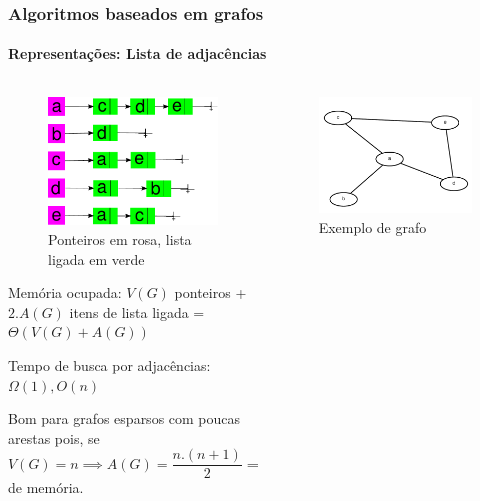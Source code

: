 \begin{frame}
	\frametitle{Algoritmos baseados em grafos}
	\framesubtitle{Representações: Lista de adjacências}
	\begin{columns}
	\begin{column}{0.6\textwidth}
		\begin{figure}
			\centering
			\includegraphics[width=0.4\linewidth]{images/listasDeAdjacencias}
			\caption{Ponteiros em rosa, lista ligada em verde}
			\label{fig:listasdeadjacencias}
		\end{figure}
		\par Memória ocupada: $V(G)$ ponteiros + $2.A(G)$ itens de lista ligada =  $\Theta(V(G) + A(G))$
		\par Tempo de busca por adjacências: $\Omega(1), O(n)$
		\par Bom para grafos esparsos com poucas arestas pois, se $V(G) = n \implies A(G) = \dfrac{n.(n+1)}{2} \implies O(n^2)$ de memória.
	\end{column}
	\begin{column}{0.4\textwidth}
		\begin{figure}
			\centering
			\includegraphics[width=\linewidth]{images/listasDeAdjacenciasGrafo}
			\caption{Exemplo de grafo}
			\label{fig:listasdeadjacenciasgrafo}
		\end{figure}
	\end{column}
\end{columns}
\end{frame}

